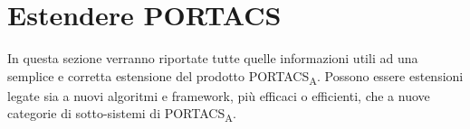 \section{Estendere PORTACS}
In questa sezione verranno riportate tutte quelle informazioni utili ad una semplice e corretta estensione del prodotto PORTACS\textsubscript{A}. Possono essere estensioni legate sia a nuovi algoritmi e framework, più efficaci o efficienti, che a nuove categorie di sotto-sistemi di PORTACS\textsubscript{A}.














